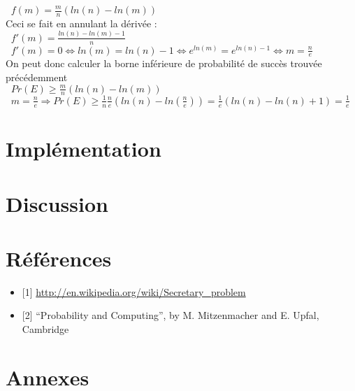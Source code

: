 \documentclass[a4paper,10pt]{article}
\begin{document}
\begin{math}\;\;f(m) = \frac{m}{n} (ln(n) - ln(m))\end{math}\\

Ceci se fait en annulant la dérivée :\\

\begin{math}\;\;f'(m) = \frac{ln(n) - ln(m) - 1}{n}\end{math}\\

\begin{math}\;\;f'(m) = 0 \Leftrightarrow ln(m) = ln(n) - 1\Leftrightarrow e^{ln(m)} = e^{ln(n) - 1}\Leftrightarrow m = \frac{n}{e}\end{math}\\

On peut donc calculer la borne inférieure de probabilité de succès trouvée précédemment\\

\begin{math}\;\; Pr(E) \geq \frac{m}{n} (ln(n) - ln(m))\end{math}\\

\begin{math}\;\; m = \frac{n}{e} \Rightarrow Pr(E) \geq \frac{1}{n} \frac{n}{e}(ln(n) - ln(\frac{n}{e}))
= \frac{1}{e} (ln(n) - ln(n) + 1) = \frac{1}{e}\end{math}\\


\section{Implémentation}



\section{Discussion}
\section{Références}
\begin{itemize}
  \item {[}1] \url{http://en.wikipedia.org/wiki/Secretary_problem}
  \item {[}2] “Probability and Computing”, by M. Mitzenmacher and E. Upfal, Cambridge
\end{itemize}
\section{Annexes}
\end{document}
